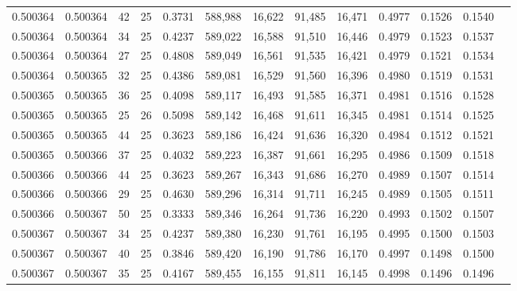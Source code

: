 \begin{tabular}{rrrrrrrrrrrrr}
0.500364 & 0.500364 &    42 &  25 &                                     0.3731 & 588,988 &  16,622 &  91,485 &  16,471 & 0.4977 & 0.1526 & 0.1540 \\
0.500364 & 0.500364 &    34 &  25 &                                     0.4237 & 589,022 &  16,588 &  91,510 &  16,446 & 0.4979 & 0.1523 & 0.1537 \\
0.500364 & 0.500364 &    27 &  25 &                                     0.4808 & 589,049 &  16,561 &  91,535 &  16,421 & 0.4979 & 0.1521 & 0.1534 \\
0.500364 & 0.500365 &    32 &  25 &                                     0.4386 & 589,081 &  16,529 &  91,560 &  16,396 & 0.4980 & 0.1519 & 0.1531 \\
0.500365 & 0.500365 &    36 &  25 &                                     0.4098 & 589,117 &  16,493 &  91,585 &  16,371 & 0.4981 & 0.1516 & 0.1528 \\
0.500365 & 0.500365 &    25 &  26 &                                     0.5098 & 589,142 &  16,468 &  91,611 &  16,345 & 0.4981 & 0.1514 & 0.1525 \\
0.500365 & 0.500365 &    44 &  25 &                                     0.3623 & 589,186 &  16,424 &  91,636 &  16,320 & 0.4984 & 0.1512 & 0.1521 \\
0.500365 & 0.500366 &    37 &  25 &                                     0.4032 & 589,223 &  16,387 &  91,661 &  16,295 & 0.4986 & 0.1509 & 0.1518 \\
0.500366 & 0.500366 &    44 &  25 &                                     0.3623 & 589,267 &  16,343 &  91,686 &  16,270 & 0.4989 & 0.1507 & 0.1514 \\
0.500366 & 0.500366 &    29 &  25 &                                     0.4630 & 589,296 &  16,314 &  91,711 &  16,245 & 0.4989 & 0.1505 & 0.1511 \\
0.500366 & 0.500367 &    50 &  25 &                                     0.3333 & 589,346 &  16,264 &  91,736 &  16,220 & 0.4993 & 0.1502 & 0.1507 \\
0.500367 & 0.500367 &    34 &  25 &                                     0.4237 & 589,380 &  16,230 &  91,761 &  16,195 & 0.4995 & 0.1500 & 0.1503 \\
0.500367 & 0.500367 &    40 &  25 &                                     0.3846 & 589,420 &  16,190 &  91,786 &  16,170 & 0.4997 & 0.1498 & 0.1500 \\
0.500367 & 0.500367 &    35 &  25 &                                     0.4167 & 589,455 &  16,155 &  91,811 &  16,145 & 0.4998 & 0.1496 & 0.1496 \\

\end{tabular}
